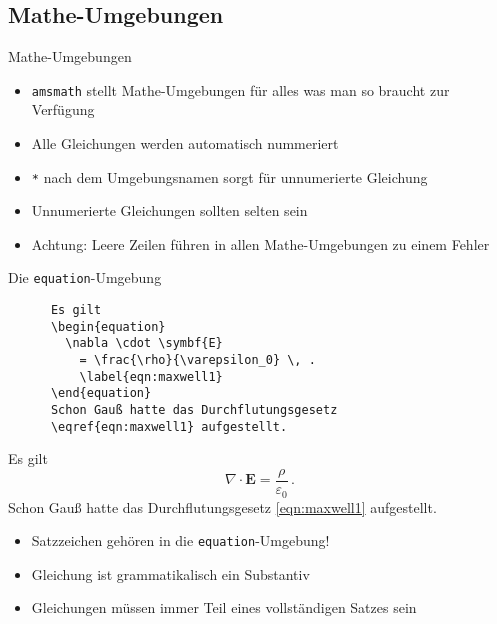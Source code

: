 \subsection{Mathe-Umgebungen}

\begin{frame}{
  Mathe-Umgebungen
  \hfill
}
  \begin{itemize}
    \item \texttt{amsmath} stellt Mathe-Umgebungen für alles was man so braucht zur Verfügung
      \item Alle Gleichungen werden automatisch nummeriert
      \item \texttt{*} nach dem Umgebungsnamen sorgt für unnumerierte Gleichung
      \item Unnumerierte Gleichungen sollten selten sein
      \item \alert{Achtung:} Leere Zeilen führen in allen Mathe-Umgebungen zu einem Fehler
  \end{itemize}
\end{frame}

\begin{frame}[fragile]{Die \texttt{equation}-Umgebung}
  \begin{CodeExample}{0.60}
    \begin{verbatim}
      Es gilt
      \begin{equation}
        \nabla \cdot \symbf{E}
          = \frac{\rho}{\varepsilon_0} \, .
          \label{eqn:maxwell1}
      \end{equation}
      Schon Gauß hatte das Durchflutungsgesetz
      \eqref{eqn:maxwell1} aufgestellt.
    \end{verbatim}
  \CodeResult
  \begin{minipage}[c][8\baselineskip][c]{\textwidth}
      Es gilt
      \begin{equation}
        \nabla \cdot \symbf{E}
          = \frac{\rho}{\varepsilon_0} \, .
          \label{eqn:maxwell1}
      \end{equation}
      Schon Gauß hatte das Durchflutungsgesetz \eqref{eqn:maxwell1} aufgestellt.
    \end{minipage}
  \end{CodeExample}

  \begin{itemize}
    \item Satzzeichen gehören in die \texttt{equation}-Umgebung!
    \item Gleichung ist grammatikalisch ein Substantiv
    \item Gleichungen müssen immer Teil eines vollständigen Satzes sein
  \end{itemize}
\end{frame}

